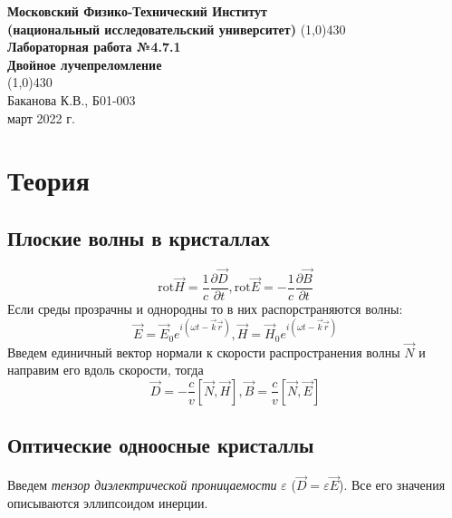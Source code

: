 \documentclass[a4paper, 12pt]{article}%
\begin{document}
\begin{titlepage}

\begin{center}
\large\textbf{Московский Физико-Технический Институт}\\
\large\textbf{(национальный исследовательский университет)}
\vfill
\line(1,0){430}\\[3mm]
\huge\textbf{Лабораторная работа №4.7.1}\\
\large\textbf{Двойное лучепреломление}\\
\line(1,0){430}\\[1mm]
\vfill
\large Баканова К.В., Б01-003\\
\large март 2022 г.\\
\end{center}

\end{titlepage}
\section*{Теория}
\subsection*{Плоские волны в кристаллах}
\begin{equation}
\text{rot} \vec{H} = \dfrac{1}{c}\dfrac{\partial \vec{D}}{\partial t}, \text{rot} \vec{E} = -\dfrac{1}{c}\dfrac{\partial \vec{B}}{\partial t}
\end{equation}
Если среды прозрачны и однородны то в них распорстраняются волны:
\begin{equation}
\vec E = \vec{E}_0 e^{i(\omega t - \vec{k}\vec{r})}, \vec{H} = \vec{H}_0e^{i(\omega t - \vec{k}\vec{r})}
\end{equation}
Введем единичный вектор нормали к скорости распространения волны $\vec{N}$ и направим его вдоль скорости, тогда
\begin{equation}
\vec{D} = -\dfrac{c}{v}\left[\vec{N}, \vec{H}\right], \vec{B} = \dfrac{c}{v}\left[	\vec{N}, \vec{E}\right]
\end{equation}
\subsection*{Оптические одноосные кристаллы}
Введем \textit{тензор диэлектрической проницаемости} $\varepsilon$ ($\vec{D} = \varepsilon \vec{E}$). Все его значения описываются эллипсоидом инерции. 
\end{document}
